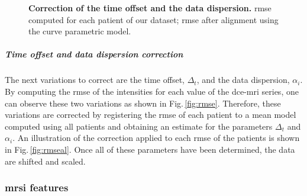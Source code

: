 \documentclass[final,3p,times,twocolumn]{elsarticle}
\begin{document}
\begin{figure}
  \centering
  \hspace*{\fill}
   \hfill
  \hspace*{\fill}
  \caption{\textbf{Correction of the time offset and the data
    dispersion.} \protect{} \acs*{rmse} computed for each
  patient of our dataset; \protect{} \acs*{rmse} after alignment using the curve parametric model.}
  \label{fig:curveal}
\end{figure}

\subparagraph{Time offset and data dispersion correction} The next variations
to correct are the time offset, $\Delta_t$, and the data dispersion,
$\alpha_i$. By computing the \ac{rmse} of the intensities for each value of the
\ac{dce}-\ac{mri} series, one can observe these two variations as shown in
Fig.\,\ref{fig:rmse}. Therefore, these variations are corrected by registering
the \ac{rmse} of each patient to a mean model computed using all patients and
obtaining an estimate for the parameters $\Delta_t$ and $\alpha_i$. An
illustration of the correction applied to each \ac{rmse} of the patients is
shown in Fig.\,\ref{fig:rmseal}. Once all of these parameters have been
determined, the data are shifted and scaled.

\subsubsection{\ac{mrsi} features}\label{features:mrsi}
\end{document}
